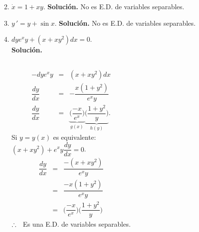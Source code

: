 \documentclass{beamer}
\begin{document}
\begin{frame}[t]
	\begin{exampleblock}{}
		\begin{enumerate}
			\setcounter{enumi}{1}
		\item \(\dot{x} =1+xy\). \textbf{Solución.} No es E.D. de variables separables.
		\item \(y \,' =y+ \sin x\). \textbf{Solución.} No es E.D. de variables separables.
		\item \(dye^xy+(x+xy^2)dx=0 \). \\
			\textbf{Solución.} 
				\begin{columns}[t]
					\[
						\begin{array}{rcl}
							- dye^xy & = & (x+xy^2) dx \\[2mm]
							\dfrac{dy}{dx} & = & - \dfrac{x(1+y^2)}{e^xy} \\[2mm]
							\dfrac{dy}{dx} & = & \underbrace{\Bigg(\dfrac{-x}{e^x}\Bigg)}_{g(x)} \underbrace{\Bigg(\dfrac{1+y^2}{y}\Bigg)}_{h(y)}.
						\end{array}
					\]
					Si \(y=y(x)\) es equivalente:\\ \((x+xy^2) +e^xy \dfrac{dy}{dx} =0\).
					\[
						\begin{array}{rcl}
							\dfrac{dy}{dx} & = & \dfrac{-(x+xy^2)}{e^xy} \\[2mm]
							& = & \dfrac{-x(1+y^2)}{e^xy} \\[2mm]
							& = & \Bigg(\dfrac{-x}{e^x}\Bigg) \Bigg(\dfrac{1+y^2}{y}\Bigg)
						\end{array}
					\]
					\(\therefore \hspace{2mm}\) Es una E.D. de variables separables.
				\end{columns}
		\end{enumerate}
	\end{exampleblock}
\end{frame}
\end{document}
